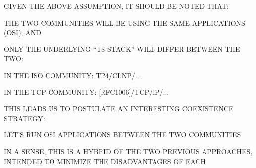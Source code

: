 \begin{bwslide}

\begin{nrtc}
\item	GIVEN THE ABOVE ASSUMPTION, IT SHOULD BE NOTED THAT:
    \begin{nrtc}
    \item	THE TWO COMMUNITIES WILL BE USING THE SAME APPLICATIONS (OSI),
		AND

    \item	ONLY THE UNDERLYING ``TS-STACK'' WILL DIFFER BETWEEN THE TWO:
	\begin{nrtc}
	\item	IN THE ISO COMMUNITY: TP4/CLNP/$\ldots$

	\item	IN THE TCP COMMUNITY: [RFC1006]/TCP/IP/$\ldots$
	\end{nrtc}
    \end{nrtc}

\item	THIS LEADS US TO POSTULATE AN INTERESTING COEXISTENCE
	STRATEGY:
    \begin{nrtc}
    \item	LET'S RUN OSI APPLICATIONS BETWEEN THE TWO COMMUNITIES
    \end{nrtc}

\item	IN A SENSE, THIS IS A HYBRID OF THE TWO PREVIOUS APPROACHES,
	INTENDED TO MINIMIZE THE DISADVANTAGES OF EACH
\end{nrtc}
\end{bwslide}


